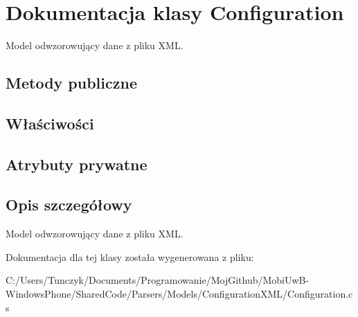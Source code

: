 \hypertarget{a00011}{}\section{Dokumentacja klasy Configuration}
\label{a00011}


Model odwzorowujący dane z pliku X\+M\+L.  


\subsection*{Metody publiczne}
\subsection*{Właściwości}
\subsection*{Atrybuty prywatne}


\subsection{Opis szczegółowy}
Model odwzorowujący dane z pliku X\+M\+L. 



Dokumentacja dla tej klasy została wygenerowana z pliku\+:\begin{DoxyCompactItemize}
\item 
C\+:/\+Users/\+Tunczyk/\+Documents/\+Programowanie/\+Moj\+Github/\+Mobi\+Uw\+B-\/\+Windows\+Phone/\+Shared\+Code/\+Parsers/\+Models/\+Configuration\+X\+M\+L/Configuration.\+cs\end{DoxyCompactItemize}

